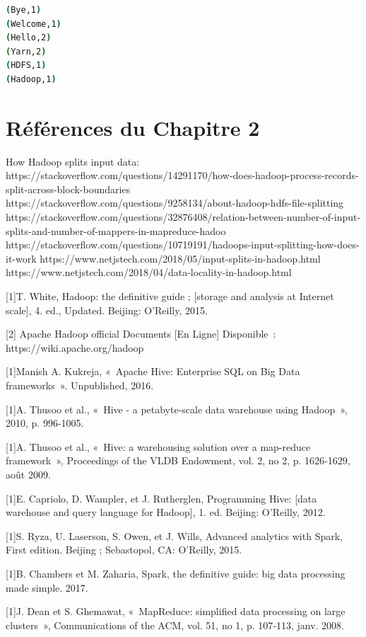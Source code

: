 \documentclass[12pt,english]{book}
\begin{document}
\begin{lstlisting}[language=bash, frame=single]
(Bye,1)
(Welcome,1)
(Hello,2)
(Yarn,2)
(HDFS,1)
(Hadoop,1)
\end{lstlisting}


\section{Références du Chapitre 2}

How Hadoop splits input data:
https://stackoverflow.com/questions/14291170/how-does-hadoop-process-records-split-across-block-boundaries
https://stackoverflow.com/questions/9258134/about-hadoop-hdfs-file-splitting
https://stackoverflow.com/questions/32876408/relation-between-number-of-input-splits-and-number-of-mappers-in-mapreduce-hadoo
https://stackoverflow.com/questions/10719191/hadoops-input-splitting-how-does-it-work
https://www.netjstech.com/2018/05/input-splits-in-hadoop.html
https://www.netjstech.com/2018/04/data-locality-in-hadoop.html		


[1]T. White, Hadoop: the definitive guide ; [storage and analysis at Internet scale], 4. ed., Updated. Beijing: O'Reilly, 2015.

[2] Apache Hadoop official Documents [En Ligne] Disponible : https://wiki.apache.org/hadoop

[1]Manish A. Kukreja, « Apache Hive: Enterprise SQL on Big Data frameworks ». Unpublished, 2016.

[1]A. Thusoo et al., « Hive - a petabyte-scale data warehouse using Hadoop », 2010, p. 996‑1005.

[1]A. Thusoo et al., « Hive: a warehousing solution over a map-reduce framework », Proceedings of the VLDB Endowment, vol. 2, no 2, p. 1626‑1629, août 2009.

[1]E. Capriolo, D. Wampler, et J. Rutherglen, Programming Hive: [data warehouse and query language for Hadoop], 1. ed. Beijing: O'Reilly, 2012.

[1]S. Ryza, U. Laserson, S. Owen, et J. Wills, Advanced analytics with Spark, First edition. Beijing ; Sebastopol, CA: O'Reilly, 2015.

[1]B. Chambers et M. Zaharia, Spark,  the definitive guide: big data processing made simple. 2017.

[1]J. Dean et S. Ghemawat, « MapReduce: simplified data processing on large clusters », Communications of the ACM, vol. 51, no 1, p. 107‑113, janv. 2008.
\end{document}
